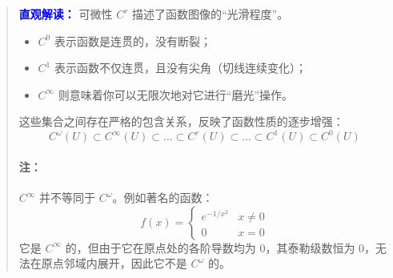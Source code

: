 \begin{quote}
\textbf{\textcolor{blue}{直观解读：}}
可微性 $C^r$ 描述了函数图像的“光滑程度”。
\begin{itemize}
    \item $C^0$ 表示函数是连贯的，没有断裂；
    \item $C^1$ 表示函数不仅连贯，且没有尖角（切线连续变化）；
    \item $C^\infty$ 则意味着你可以无限次地对它进行“磨光”操作。
\end{itemize}

这些集合之间存在严格的包含关系，反映了函数性质的逐步增强：
\[ C^\omega(U) \subset C^\infty(U) \subset \dots \subset C^r(U) \subset \dots \subset C^1(U) \subset C^0(U) \]

\paragraph*{注：}
$C^\infty$ 并不等同于 $C^\omega$。例如著名的函数：
\[ f(x) = 
\begin{cases} 
e^{-1/x^2} & x \neq 0 \\
0 & x = 0 
\end{cases} 
\]
它是 $C^\infty$ 的，但由于它在原点处的各阶导数均为 $0$，其泰勒级数恒为 $0$，无法在原点邻域内展开，因此它不是 $C^\omega$ 的。

\end{quote}

